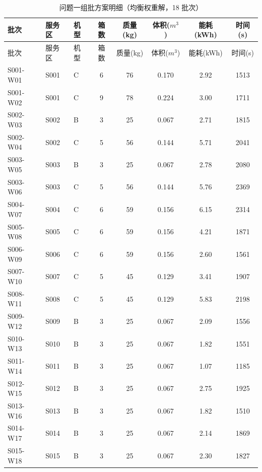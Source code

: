 \begin{center}\small\renewcommand{\arraystretch}{1.05}
\begin{longtable}{lllccccc}
\caption{问题一组批方案明细（均衡权重解，18 批次）}\label{tab:q1_batches}\\
\hline 批次 & 服务区 & 机型 & 箱数 & 质量(kg) & 体积($m^3$) & 能耗(kWh) & 时间(s) \\\hline\endfirsthead
\hline 批次 & 服务区 & 机型 & 箱数 & 质量(kg) & 体积($m^3$) & 能耗(kWh) & 时间(s) \\\hline\endhead
S001-W01 & S001 & C & 6 & 76 & 0.170 & 2.92 & 1513 \\
S001-W02 & S001 & C & 9 & 78 & 0.224 & 3.00 & 1711 \\
S002-W03 & S002 & B & 3 & 25 & 0.067 & 2.71 & 1815 \\
S002-W04 & S002 & C & 5 & 56 & 0.144 & 5.71 & 2041 \\
S003-W05 & S003 & B & 3 & 25 & 0.067 & 2.78 & 2080 \\
S003-W06 & S003 & C & 5 & 56 & 0.144 & 5.76 & 2369 \\
S004-W07 & S004 & C & 6 & 59 & 0.156 & 6.15 & 2314 \\
S005-W08 & S005 & C & 6 & 59 & 0.156 & 4.21 & 1871 \\
S006-W09 & S006 & C & 6 & 59 & 0.156 & 2.60 & 1561 \\
S007-W10 & S007 & C & 5 & 45 & 0.129 & 3.41 & 1907 \\
S008-W11 & S008 & C & 5 & 45 & 0.129 & 5.83 & 2198 \\
S009-W12 & S009 & B & 3 & 25 & 0.067 & 2.09 & 1556 \\
S010-W13 & S010 & B & 3 & 25 & 0.067 & 1.82 & 1551 \\
S011-W14 & S011 & B & 3 & 25 & 0.067 & 1.07 & 1185 \\
S012-W15 & S012 & B & 3 & 25 & 0.067 & 2.75 & 1925 \\
S013-W16 & S013 & B & 3 & 25 & 0.067 & 1.82 & 1510 \\
S014-W17 & S014 & B & 3 & 25 & 0.067 & 2.14 & 1869 \\
S015-W18 & S015 & B & 3 & 25 & 0.067 & 2.30 & 1827 \\
\hline\end{longtable}\end{center}
